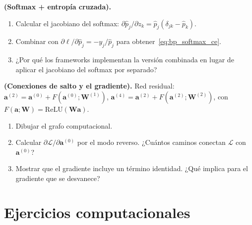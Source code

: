 \begin{ejercicio}
\textbf{(Softmax + entropía cruzada).}
\begin{enumerate}[label=(\alph*)]
  \item Calcular el jacobiano del softmax:
        $\partial\hat{p}_j/\partial z_k = \hat{p}_j(\delta_{jk}-\hat{p}_k)$.
  \item Combinar con $\partial\ell/\partial\hat{p}_j = -y_j/\hat{p}_j$
        para obtener~\eqref{eq:bp_softmax_ce}.
  \item ¿Por qué los frameworks implementan la versión combinada en lugar
        de aplicar el jacobiano del softmax por separado?
\end{enumerate}
\end{ejercicio}

\begin{ejercicio}
\textbf{(Conexiones de salto y el gradiente).}
Red residual: $\bm{a}^{(2)} = \bm{a}^{(0)} + F(\bm{a}^{(0)};\bm{W}^{(1)})$,
$\bm{a}^{(4)} = \bm{a}^{(2)} + F(\bm{a}^{(2)};\bm{W}^{(2)})$, con
$F(\bm{a};\bm{W}) = \text{ReLU}(\bm{W}\bm{a})$.
\begin{enumerate}[label=(\alph*)]
  \item Dibujar el grafo computacional.
  \item Calcular $\partial\mathcal{L}/\partial\bm{a}^{(0)}$ por el modo
        reverso. ¿Cuántos caminos conectan $\mathcal{L}$ con $\bm{a}^{(0)}$?
  \item Mostrar que el gradiente incluye un término identidad.
        ¿Qué implica para el gradiente que se desvanece?
\end{enumerate}
\end{ejercicio}

\section*{Ejercicios computacionales}

